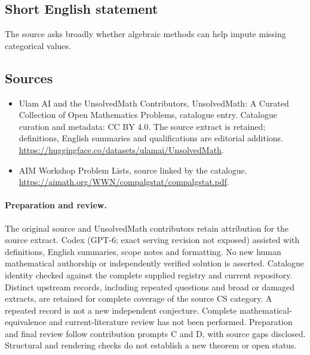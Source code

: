 \documentclass[11pt]{article}
\begin{document}
\subsection{Short English statement}
The source asks broadly whether algebraic methods can help impute missing categorical values.
\subsection{Sources}
\begin{itemize}
\item[\hypertarget{source:statement:1}{S1}] Ulam AI and the UnsolvedMath Contributors, UnsolvedMath: A Curated Collection of Open Mathematics Problems, catalogue entry. Catalogue curation and metadata: CC BY 4.0. The source extract is retained; definitions, English summaries and qualifications are editorial additions.
\url{https://huggingface.co/datasets/ulamai/UnsolvedMath}.
\item[\hypertarget{source:statement:2}{S2}] AIM Workshop Problem Lists, source linked by the catalogue.
\url{https://aimath.org/WWN/compalgstat/compalgstat.pdf}.
\end{itemize}
\paragraph{Preparation and review.}
The original source and UnsolvedMath contributors retain attribution for the source extract. Codex (GPT-6; exact serving revision not exposed) assisted with definitions, English summaries, scope notes and formatting. No new human mathematical authorship or independently verified solution is asserted. Catalogue identity checked against the complete supplied registry and current repository. Distinct upstream records, including repeated questions and broad or damaged extracts, are retained for complete coverage of the source CS category. A repeated record is not a new independent conjecture. Complete mathematical-equivalence and current-literature review has not been performed. Preparation and final review follow contribution prompts C and D, with source gaps disclosed. Structural and rendering checks do not establish a new theorem or open status.
\label{end:statement}
\end{document}
